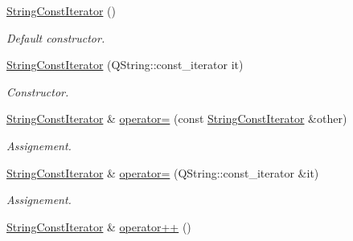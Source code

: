 \begin{DoxyCompactItemize}
\item 
\hyperlink{struct_mdt_1_1_plain_text_1_1_string_const_iterator_aebc75afef8accb5faf0dc33d065f898f}{String\+Const\+Iterator} ()
\begin{DoxyCompactList}\small\item\em Default constructor. \end{DoxyCompactList}\item 
\hyperlink{struct_mdt_1_1_plain_text_1_1_string_const_iterator_ae2cad12d2b7751eaf0a00a69678275ec}{String\+Const\+Iterator} (Q\+String\+::const\+\_\+iterator it)\hypertarget{struct_mdt_1_1_plain_text_1_1_string_const_iterator_ae2cad12d2b7751eaf0a00a69678275ec}{}\label{struct_mdt_1_1_plain_text_1_1_string_const_iterator_ae2cad12d2b7751eaf0a00a69678275ec}

\begin{DoxyCompactList}\small\item\em Constructor. \end{DoxyCompactList}\item 
\hyperlink{struct_mdt_1_1_plain_text_1_1_string_const_iterator}{String\+Const\+Iterator} \& \hyperlink{struct_mdt_1_1_plain_text_1_1_string_const_iterator_a5ff7bd8002a95fcb2e1aed0a27d4d60c}{operator=} (const \hyperlink{struct_mdt_1_1_plain_text_1_1_string_const_iterator}{String\+Const\+Iterator} \&other)\hypertarget{struct_mdt_1_1_plain_text_1_1_string_const_iterator_a5ff7bd8002a95fcb2e1aed0a27d4d60c}{}\label{struct_mdt_1_1_plain_text_1_1_string_const_iterator_a5ff7bd8002a95fcb2e1aed0a27d4d60c}

\begin{DoxyCompactList}\small\item\em Assignement. \end{DoxyCompactList}\item 
\hyperlink{struct_mdt_1_1_plain_text_1_1_string_const_iterator}{String\+Const\+Iterator} \& \hyperlink{struct_mdt_1_1_plain_text_1_1_string_const_iterator_acff7207d9b0257518a2845dbbce19f0f}{operator=} (Q\+String\+::const\+\_\+iterator \&it)\hypertarget{struct_mdt_1_1_plain_text_1_1_string_const_iterator_acff7207d9b0257518a2845dbbce19f0f}{}\label{struct_mdt_1_1_plain_text_1_1_string_const_iterator_acff7207d9b0257518a2845dbbce19f0f}

\begin{DoxyCompactList}\small\item\em Assignement. \end{DoxyCompactList}\item 
\hyperlink{struct_mdt_1_1_plain_text_1_1_string_const_iterator}{String\+Const\+Iterator} \& \hyperlink{struct_mdt_1_1_plain_text_1_1_string_const_iterator_a289ce7f324a31e2d0977ba6e9b5460dc}{operator++} ()\hypertarget{struct_mdt_1_1_plain_text_1_1_string_const_iterator_a289ce7f324a31e2d0977ba6e9b5460dc}{}\label{struct_mdt_1_1_plain_text_1_1_string_const_iterator_a289ce7f324a31e2d0977ba6e9b5460dc}


\end{DoxyCompactItemize}
